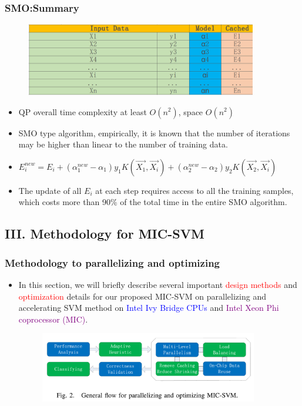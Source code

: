 \documentclass{beamer}
\begin{document}
\begin{frame}
	\frametitle{SMO:Summary}	
	\begin{figure}
		\includegraphics[width=0.9\textwidth]{fig/smo_datastructure.png}
		
	\end{figure} 
	\begin{itemize}
		\item QP overall time complexity at least $O(n^{2})$, space $O(n^{2})$
		\item SMO type algorithm, empirically, it is known that the number of iterations may be higher than
		linear to the number of training data.
		\item $E_{i}^{new} = E_i + (\alpha_{1}^{new}-\alpha_1)y_1K(\vec{X_1},\vec{X_i}) + (\alpha_{2}^{new}-\alpha_2)y_2K(\vec{X_2},\vec{X_i})$
		\item The update of all $E_i$ at each
		step requires access to all the training samples, which costs more
		than 90\% of the total time in the entire SMO algorithm. 
		
		
	\end{itemize}
\end{frame}

\subsection{III. Methodology for MIC-SVM}

\begin{frame}
	\frametitle{Methodology to parallelizing and optimizing}
	\begin{itemize}
	\item In this section, we will briefly describe several important \textcolor{red}{design
	methods} and \textcolor{red}{optimization} details for our proposed MIC-SVM on
	parallelizing and accelerating SVM method on \textcolor{blue}{Intel Ivy Bridge CPUs}
	and \textcolor{purple}{Intel Xeon Phi coprocessor (MIC)}. 
		\begin{figure}
			\includegraphics[width=0.9\textwidth]{fig/fig2_methodology.png}
		\end{figure} 
	\end{itemize}	
\end{frame}
\end{document}
